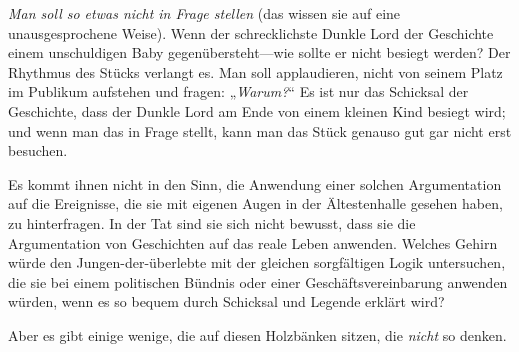\emph{Man soll so etwas nicht in Frage stellen} (das wissen sie auf eine unausgesprochene Weise). Wenn der schrecklichste Dunkle Lord der Geschichte einem unschuldigen Baby gegenübersteht—wie sollte er nicht besiegt werden? Der Rhythmus des Stücks verlangt es. Man soll applaudieren, nicht von seinem Platz im Publikum aufstehen und fragen: „\emph{Warum?}“ Es ist nur das Schicksal der Geschichte, dass der Dunkle Lord am Ende von einem kleinen Kind besiegt wird; und wenn man das in Frage stellt, kann man das Stück genauso gut gar nicht erst besuchen.

Es kommt ihnen nicht in den Sinn, die Anwendung einer solchen Argumentation auf die Ereignisse, die sie mit eigenen Augen in der Ältestenhalle gesehen haben, zu hinterfragen. In der Tat sind sie sich nicht bewusst, dass sie die Argumentation von Geschichten auf das reale Leben anwenden. Welches Gehirn würde den Jungen-der-überlebte mit der gleichen sorgfältigen Logik untersuchen, die sie bei einem politischen Bündnis oder einer Geschäftsvereinbarung anwenden würden, wenn es so bequem durch Schicksal und Legende erklärt wird?

Aber es gibt einige wenige, die auf diesen Holzbänken sitzen, die \emph{nicht} so denken.

